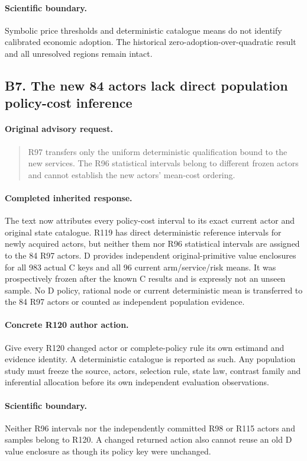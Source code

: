 \paragraph{Scientific boundary.}
Symbolic price thresholds and deterministic catalogue means do not identify calibrated economic adoption. The historical zero-adoption-over-quadratic result and all unresolved regions remain intact.

\subsection{B7. The new 84 actors lack direct population policy-cost inference}
\label{response120:B7}
\paragraph{Original advisory request.}
\begin{quote}
R97 transfers only the uniform deterministic qualification bound to the new services. The R96 statistical intervals belong to different frozen actors and cannot establish the new actors' mean-cost ordering.
\end{quote}
\paragraph{Completed inherited response.}
The text now attributes every policy-cost interval to its exact current actor and original state catalogue. R119 has direct deterministic reference intervals for newly acquired actors, but neither them nor R96 statistical intervals are assigned to the 84 R97 actors. D provides independent original-primitive value enclosures for all 983 actual C keys and all 96 current arm/service/risk means. It was prospectively frozen after the known C results and is expressly not an unseen sample. No D policy, rational node or current deterministic mean is transferred to the 84 R97 actors or counted as independent population evidence.
\paragraph{Concrete R120 author action.}
Give every R120 changed actor or complete-policy rule its own estimand and evidence identity. A deterministic catalogue is reported as such. Any population study must freeze the source, actors, selection rule, state law, contrast family and inferential allocation before its own independent evaluation observations.
\paragraph{Scientific boundary.}
Neither R96 intervals nor the independently committed R98 or R115 actors and samples belong to R120. A changed returned action also cannot reuse an old D value enclosure as though its policy key were unchanged.

